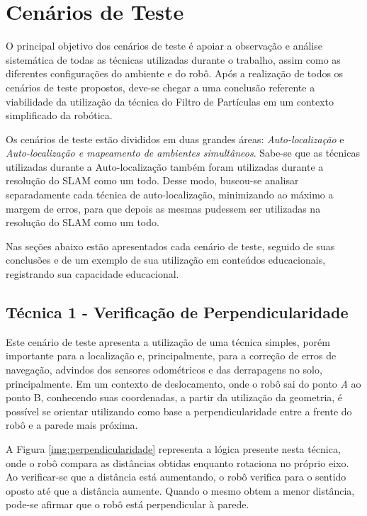 \chapter[Cenários de Teste]{Cenários de Teste}

O principal objetivo dos cenários de teste é apoiar a observação e análise sistemática de todas as técnicas utilizadas durante o trabalho, assim como as diferentes configurações do ambiente e do robô. Após a realização de todos os cenários de teste propostos, deve-se chegar a uma conclusão referente a viabilidade da utilização da técnica do Filtro de Partículas em um contexto simplificado da robótica. 

Os cenários de teste estão divididos em duas grandes áreas: \textit{Auto-localização} e \textit{Auto-localização e mapeamento de ambientes simultâneos}. Sabe-se que as técnicas utilizadas durante a Auto-localização também foram utilizadas durante a resolução do SLAM como um todo. Desse modo, buscou-se analisar separadamente cada técnica de auto-localização, minimizando ao máximo a margem de erros, para que depois as mesmas pudessem ser utilizadas na resolução do SLAM como um todo.

Nas seções abaixo estão apresentados cada cenário de teste, seguido de suas conclusões e de um exemplo de sua utilização em conteúdos educacionais, registrando sua capacidade educacional.

\section{Técnica 1 - Verificação de Perpendicularidade} %
\label{sec:tecnica1}

	Este cenário de teste apresenta a utilização de uma técnica simples, porém importante para a localização e, principalmente, para a correção de erros de navegação, advindos dos sensores odométricos e das derrapagens no solo, principalmente. Em um contexto de deslocamento, onde o robô sai do ponto \textit{A} ao ponto {B}, conhecendo suas coordenadas, a partir da utilização da geometria, é possível se orientar utilizando como base a perpendicularidade entre a frente do robô e a parede mais próxima.

	A Figura \ref{img:perpendicularidade} representa a lógica presente nesta técnica, onde o robô compara as distâncias obtidas enquanto rotaciona no próprio eixo. Ao verificar-se que a distância está aumentando, o robô verifica para o sentido oposto até que a distância aumente. Quando o mesmo obtem a menor distância, pode-se afirmar que o robô está perpendicular à parede.

